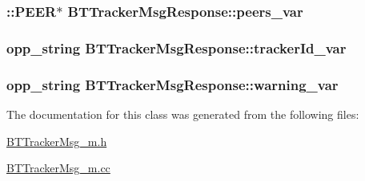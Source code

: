 \subsubsection[{peers\+\_\+var}]{\setlength{\rightskip}{0pt plus 5cm}\+::{\bf P\+E\+E\+R}$\ast$ B\+T\+Tracker\+Msg\+Response\+::peers\+\_\+var\hspace{0.3cm}{\ttfamily [protected]}}\label{classBTTrackerMsgResponse_a1aa01eb6c2c6a28498173d1d0f578b72}
\hypertarget{classBTTrackerMsgResponse_a95d4eed6b7304f41ac4d967020ca5024}{}
\subsubsection[{tracker\+Id\+\_\+var}]{\setlength{\rightskip}{0pt plus 5cm}opp\+\_\+string B\+T\+Tracker\+Msg\+Response\+::tracker\+Id\+\_\+var\hspace{0.3cm}{\ttfamily [protected]}}\label{classBTTrackerMsgResponse_a95d4eed6b7304f41ac4d967020ca5024}
\hypertarget{classBTTrackerMsgResponse_a2d586220ffb2eb63253d19dbbce252f8}{}
\subsubsection[{warning\+\_\+var}]{\setlength{\rightskip}{0pt plus 5cm}opp\+\_\+string B\+T\+Tracker\+Msg\+Response\+::warning\+\_\+var\hspace{0.3cm}{\ttfamily [protected]}}\label{classBTTrackerMsgResponse_a2d586220ffb2eb63253d19dbbce252f8}


The documentation for this class was generated from the following files\+:\begin{DoxyCompactItemize}
\item 
\hyperlink{BTTrackerMsg__m_8h}{B\+T\+Tracker\+Msg\+\_\+m.\+h}\item 
\hyperlink{BTTrackerMsg__m_8cc}{B\+T\+Tracker\+Msg\+\_\+m.\+cc}\end{DoxyCompactItemize}
